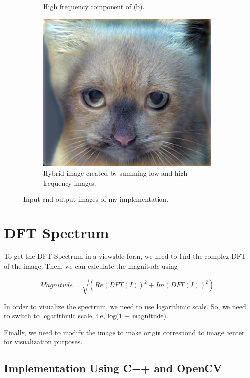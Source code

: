 \documentclass{article}
\begin{document}
\begin{figure}[!htb]
\begin{subfigure}{.35\textwidth}
  \caption{High frequency component of (b).}
\end{subfigure}
\begin{subfigure}{.6\textwidth}
  \centering
  \includegraphics[width=1\textwidth]{hybrid_image.jpg}
  \caption{Hybrid image created by summing low and high frequency images.}
\end{subfigure}
\caption{Input and output images of my implementation.}
\end{figure}

\newpage

\section{DFT Spectrum}

To get the DFT Spectrum in a viewable form, we need to find the complex DFT of the image. Then, we can calculate the magnitude using

\begin{equation}
Magnitude = \sqrt{(Re(DFT(I))^2 + Im(DFT(I))^2)}
\end{equation}

In order to visualize the spectrum, we need to use logarithmic scale. So, we need to switch to logarithmic scale, i.e, log(1 + magnitude).

Finally, we need to modify the image to make origin correspond to image center for visualization purposes. 

\subsection{Implementation Using C++ and OpenCV}
\end{document}
